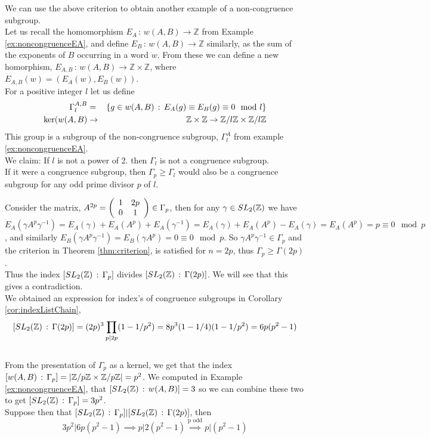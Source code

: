 \begin{example}
We can use the above criterion to obtain another example of a non-congruence subgroup. \\
Let us recall the homomorphism $E_A \, : \, w(A,B) \rightarrow \mathbb{Z}$ from Example \ref{ex:noncongruenceEA}, and define $E_B \, : \, w(A,B) \rightarrow \mathbb{Z}$ similarly, as the sum of the exponents of $B$ occurring in a word $w$. From these we can define a new homorphism, $E_{A,B} \, : \, w(A,B) \rightarrow \mathbb{Z} \times \mathbb{Z}$, where $E_{A,B}(w) = (E_A(w), E_B(w))$.\\ 
For a positive integer $l$ let us define 
\begin{eqnarray*}
\Gamma_{l}^{A,B} &=& \{g \in w(A,B) \, :\, E_A(g) \equiv E_B(g) \equiv 0 \mod l\} \\
\ker(w(A,B) & \rightarrow & \mathbb{Z} \times \mathbb{Z} \rightarrow \znz[l] \times \znz[l]
\end{eqnarray*} This group is a subgroup of the non-congruence subgroup, $\Gamma_{l}^A$ from example \ref{ex:noncongruenceEA}.\\

We claim: If $l$ is not a power of 2. then $\Gamma_l$ is not a congruence subgroup. \\
If it were a congruence subgroup, then $\Gamma_p \geq \Gamma_l$ would also be a congruence subgroup for any odd prime divisor $p$ of $l$.

Consider the matrix, $A^{2p} = \left(\begin{array}{ c c } 1 & 2p \\ 0 & 1 \end{array} \right) \in \Gamma_p$, then for any $\gamma \in \sltz$ we have $E_A(\gamma A^p \gamma^{-1}) = E_A(\gamma) + E_A(A^p)+ E_A(\gamma^{-1}) = E_A(\gamma) + E_A(A^p) - E_A(\gamma) = E_A(A^p) = p \equiv 0 \mod p$, and similarly $E_B(\gamma A^p \gamma^{-1}) = E_B(\gamma A^p) = 0 \equiv 0 \mod p$. So $\gamma A^p \gamma^{-1} \in \Gamma_p$ and the criterion in Theorem \ref{thm:criterion}, is satisfied for $n = 2p$, thus $ \Gamma_p \geq \Gamma(2p)$.
\\
Thus the index $[\sltz \, : \, \Gamma_p]$ divides $[\sltz \,: \, \Gamma(2p)]$. We will see that this gives a contradiction.
\\

We obtained an expression for index's of congruence subgroups in Corollary \ref{cor:indexListChain},
 $$[\sltz \,: \, \Gamma(2p)] = (2p)^3\prod_{p \mid 2p}(1 - 1/p^2) = 8p^3( 1 - 1/4)(1 - 1/p^2) = 6p(p^2 -1)$$
\\
From the presentation of $\Gamma_p$ as a kernel, we get that the index $[w(A,B) \, : \, \Gamma_p] = \vert \znz[p] \times \znz[p] \vert = p^2$. We computed in Example \ref{ex:noncongruenceEA}, that $[\sltz \, : \, w(A,B)] = 3$ so we can combine these two to get $[\sltz \, : \, \Gamma_p] = 3p^2$. 
\\
Suppose then that $[\sltz \, : \, \Gamma_p] \vert [\sltz \,: \, \Gamma(2p)]$, then $$3p^2 \vert 6p(p^2 -1) \implies p \vert 2(p^2 -1) \stackrel{\text{p odd}}{\implies} p \vert (p^2 -1) $$


\end{example}
